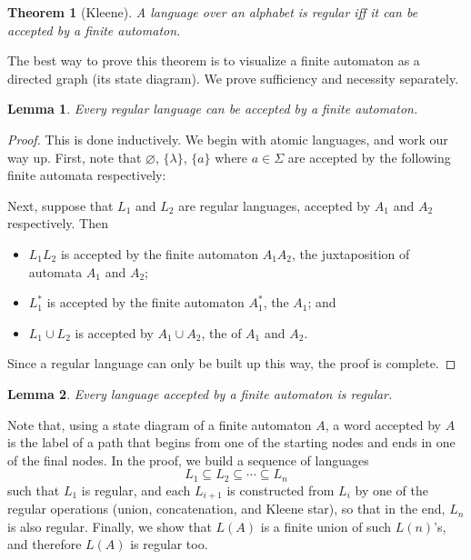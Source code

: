 \documentclass[12pt]{article}
\newtheorem{thm}{Theorem}
\newtheorem{lem}{Lemma}
\begin{document}
\begin{thm}[Kleene] A language over an alphabet is regular iff it can be accepted by a finite automaton. \end{thm}

The best way to prove this theorem is to visualize a finite automaton as a directed graph (its state diagram).  We prove sufficiency and necessity separately.

\begin{lem}  Every regular language can be accepted by a finite automaton. \end{lem}
\begin{proof}
This is done inductively.  We begin with atomic languages, and work our way up.  First, note that $\varnothing$, $\lbrace \lambda\rbrace$, $\lbrace a \rbrace$ where $a\in \Sigma$ are accepted by the following finite automata respectively:

\begin{figure}[!h]
\centering
{}
\end{figure}

Next, suppose that $L_1$ and $L_2$ are regular languages, accepted by $A_1$ and $A_2$ respectively.  Then
\begin{itemize}
\item $L_1L_2$ is accepted by the finite automaton $A_1A_2$, the juxtaposition of automata $A_1$ and $A_2$;
\item $L_1^*$ is accepted by the finite automaton $A_1^*$, the  $A_1$; and
\item $L_1\cup L_2$ is accepted by $A_1\cup A_2$, the  of $A_1$ and $A_2$.
\end{itemize}

Since a regular language can only be built up this way, the proof is complete.
\end{proof}

\begin{lem}  Every language accepted by a finite automaton is regular. \end{lem}

Note that, using a state diagram of a finite automaton $A$, a word accepted by $A$ is the label of a path that begins from one of the starting nodes and ends in one of the final nodes.  In the proof, we build a sequence of languages $$L_1 \subseteq L_2 \subseteq \cdots \subseteq L_n$$
such that $L_1$ is regular, and each $L_{i+1}$ is constructed from $L_i$ by one of the regular operations (union, concatenation, and Kleene star), so that in the end, $L_n$ is also regular.  Finally, we show that $L(A)$ is a finite union of such $L(n)$'s, and therefore $L(A)$ is regular too.
\end{document}
